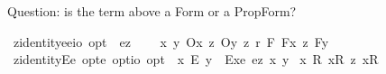 \begin{isabellebody}
\isamarkuptrue%
%
\begin{isamarkuptext}%
Question: is the term above a Form or a PropForm?%
\end{isamarkuptext}%
\isamarkuptrue%
\isamarkupfalse%
\ z{\isacharunderscore}identity{\isacharcolon}{\isacharcolon}{\isachardoublequoteopen}{\isacharparenleft}e{\isasymRightarrow}e{\isasymRightarrow}io{\isacharparenright}\ opt{\isachardoublequoteclose}\ \ {\isachardoublequoteopen}{\isacharequal}\isactrlsub e\isactrlsup z\ {\isasymequiv}\ \isanewline
\ \ {\isasymlambda}x\ y{\isachardot}\ {\isacharparenleft}{\isacharparenleft}{\isacharless}O\isactrlsup {\isacharbang}{\isasymbullet}{\isachardot}x{\isachardot}{\isachargreater}\ {\isasymand}\isactrlsup z\ {\isacharless}O\isactrlsup {\isacharbang}{\isasymbullet}{\isachardot}y{\isachardot}{\isachargreater}{\isacharparenright}\ {\isasymand}\isactrlsup z\ {\isasymbox}\isactrlsup r\ {\isacharparenleft}{\isasymforall}{\isacharparenleft}{\isasymlambda}F{\isachardot}\ {\isacharless}{\isachardot}F{\isachardot}{\isasymbullet}{\isachardot}x{\isachardot}{\isachargreater}\ {\isasymequiv}\isactrlsup z\ {\isacharless}{\isachardot}F{\isachardot}{\isasymbullet}{\isachardot}y{\isachardot}{\isachargreater}{\isacharparenright}{\isacharparenright}{\isacharparenright}{\isacharparenright}{\isachardoublequoteclose}\isanewline
\isanewline
{}\isamarkupfalse%
\ z{\isacharunderscore}identityE{\isacharcolon}{\isacharcolon}{\isachardoublequoteopen}{\isacharparenleft}e\ opt{\isasymRightarrow}e\ opt{\isasymRightarrow}io\ opt{\isacharparenright}{\isachardoublequoteclose}\ \ {\isachardoublequoteopen}x\ {\isacharequal}\isactrlsub E\ y\ {\isasymequiv}\ {\isacharparenleft}Exe{}\ {\isacharequal}\isactrlsub e\isactrlsup z\ x\ y{\isacharparenright}{\isachardoublequoteclose}%
\isamarkuptrue%
\isamarkupfalse%
\ {\isachardoublequoteopen}{\isacharbrackleft}{\isasymforall}{\isacharparenleft}{\isasymlambda}x{\isachardot}\ {\isasymexists}{\isacharparenleft}{\isasymlambda}R{\isachardot}\ {\isacharparenleft}{\isacharless}{\isachardot}x{\isachardot}{\isasymcirc}{\isachardot}R{\isachardot}{\isachargreater}\ {\isasymrightarrow}\isactrlsup z\ {\isacharless}{\isachardot}x{\isachardot}{\isasymcirc}R{}{\isachargreater}{\isacharparenright}{\isacharparenright}{\isacharparenright}{\isacharbrackright}{\isachardoublequoteclose}%
\isadelimproof
\ %
\endisadelimproof
%
\isatagproof

\end{isabellebody}
